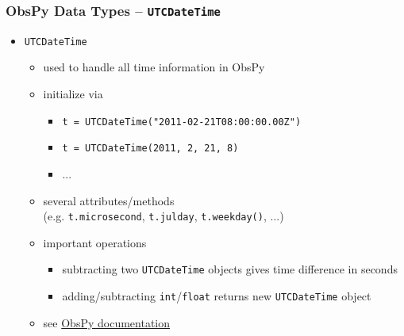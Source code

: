 \documentclass[t,10pt,compress=false,usepdftitle=false]{beamer}
\begin{document}
\begin{frame}[fragile]
    \frametitle{ObsPy Data Types -- \tt{UTCDateTime}}
    \begin{itemize}
    \item \verb#UTCDateTime#
        \begin{itemize}
        \item used to handle all time information in ObsPy
        \item initialize via
            \begin{itemize}
            \item \verb#t = UTCDateTime("2011-02-21T08:00:00.00Z")#
            \item \verb#t = UTCDateTime(2011, 2, 21, 8)#
            \item ...
            \end{itemize}
        \item several attributes/methods\\ (e.g. \verb#t.microsecond#, \verb#t.julday#, \verb#t.weekday()#, ...)
        \item important operations
            \begin{itemize}
            \item subtracting two \verb#UTCDateTime# objects gives time difference in seconds
            \item adding/subtracting \verb#int#/\verb#float# returns new \verb#UTCDateTime# object
            \end{itemize}
        \item see \href{file:///home/messuser/obspy/docs/packages/auto/obspy.core.utcdatetime.UTCDateTime.html}{ObsPy documentation}
        \end{itemize}
    \end{itemize}
\end{frame}
\end{document}
